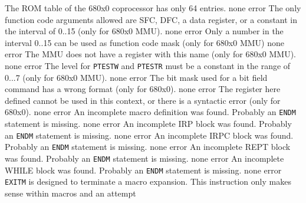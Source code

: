 \documentclass[12pt,twoside]{report}
\newcommand{\tty}[1]{{\tt #1}}
\begin{document}
\begin{description}
               {The ROM table of the 680x0 coprocessor has only 64 entries.}
               {none}
               {error}
               {The only function code arguments allowed are SFC, DFC, a
                data register, or a constant in the interval of 0..15 (only
                for 680x0 MMU).}
               {none}
               {error}
               {Only a number in the interval 0..15 can be used as
                function code mask (only for 680x0 MMU)}
               {none}
               {error}
               {The MMU does not have a register with this name (only for
                680x0 MMU).}
               {none}
               {error}
               {The level for \tty{PTESTW} and \tty{PTESTR} must be a constant in the
                range of 0...7 (only for 680x0 MMU).}
               {none}
               {error}
               {The bit mask used for a bit field command has a wrong
                format (only for 680x0).}
               {none}
               {error}
               {The register here defined cannot be used in this context,
                or there is a syntactic error (only for 680x0).}
               {none}
               {error}
               {An incomplete macro definition was found. Probably an
                \tty{ENDM} statement is missing.}
               {none}
               {error}
               {An incomplete IRP block was found. Probably an
                \tty{ENDM} statement is missing.}
               {none}
               {error}
               {An incomplete IRPC block was found. Probably an
                \tty{ENDM} statement is missing.}
               {none}
               {error}
               {An incomplete REPT block was found. Probably an
                \tty{ENDM} statement is missing.}
               {none}
               {error}
               {An incomplete WHILE block was found. Probably an
                \tty{ENDM} statement is missing.}
               {none}
               {error}
               {\tty{EXITM} is designed to terminate a macro expansion.  This
                instruction only makes sense within macros and an attempt
}
\end{description}
\end{document}
